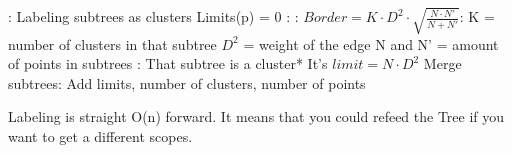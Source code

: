 \documentclass[12pt, a4paper, twocolumn]{article}
\begin{document}
\begin{appendices}
\newpage
\begin{algorithm}[h]
  \begin{algorithmic}[3]
      
    : \Comment Labeling subtrees as clusters
      \State Limits(p) = 0
      :        
        :
            \State $Border = K \cdot D^2 \cdot \sqrt{\frac{N \cdot N'}{N + N'}}$:
            \State \indent K = number of clusters in that subtree
            \State \indent $D^2$ = weight of the edge
            \State \indent N and N' = amount of points in subtrees
            :
              \State *That subtree is a cluster*
              \State It's $limit = N \cdot D^2$
            \EndIf
        \EndFor
        \State Merge subtrees: 
        \State \indent Add limits, number of clusters, number of points
      \EndFor
    \EndProcedure
  \end{algorithmic}
\end{algorithm}

Labeling is straight O(n) forward. It means that you could refeed the Tree if you want to get a different scopes.

\end{appendices}
\end{document}
